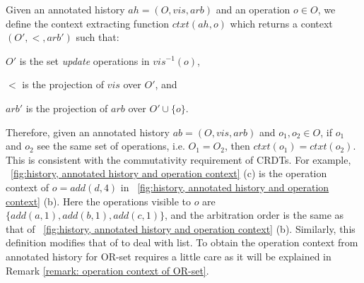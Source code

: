 
Given an annotated history $ah = (O,\mathit{vis},\mathit{arb})$ and an
operation $o \in O$, we define the context extracting function $ctxt(ah, o)$
which returns a context $(O', <, \mathit{arb'})$ such that:
\begin{inparaenum}[(i)]
\item $O'$ is the set \emph{update} operations in $\mathit{vis}^{-1}(o)$,
\item $<$ is the projection of $\mathit{vis}$ over $O'$, and
\item $\mathit{arb'}$ is the projection of $\mathit{arb}$ over $O' \cup \{o\}$.
\end{inparaenum} Therefore, given an annotated history $ab =
(O,\mathit{vis},\mathit{arb})$ and $o_1,o_2 \in O$, if $o_1$ and $o_2$
see the same set of operations, i.e. $O_1 = O_2$, then $ctxt(o_1) = ctxt(o_2)$.
%
This is consistent with the commutativity requirement of CRDTs.
For example, \figurename~\ref{fig:history, annotated history and
  operation context} 
(c) is the operation context of $o = \mathit{add}(d,4)$ in
\figurename~\ref{fig:history, annotated history and operation context}
(b).
Here the operations visible to $o$ are $\{
\mathit{add}(a,1), \mathit{add}(b,1), \mathit{add}(c,1)\}$, and the
arbitration order is the same as that of \figurename~\ref{fig:history, annotated history and operation context}
(b).
Similarly, this definition modifies that of \cite{Burckhardt:2014}
to deal with list.
%
To obtain the operation context from annotated history for OR-set
requires a little care as it will be explained in Remark \ref{remark:
  operation context of OR-set}.


